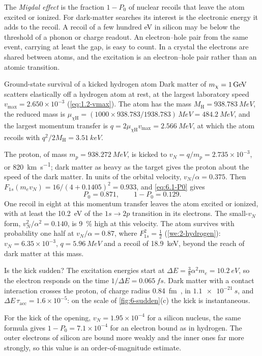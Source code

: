 The \emph{Migdal effect} is the fraction $1 - P_0$ of nuclear recoils that leave the atom excited or ionized. For dark-matter searches its interest is the electronic energy it adds to the recoil. A recoil of a few hundred eV in silicon may be below the threshold of a phonon or charge readout. An electron--hole pair from the same event, carrying at least the gap, is easy to count. In a crystal the electrons are shared between atoms, and the excitation is an electron--hole pair rather than an atomic transition.

\begin{workedexample}{Ground-state survival of a kicked hydrogen atom}\label{we:6-hydrogen}
Dark matter of $m_{\chi} = \SI{1}{GeV}$ scatters elastically off a hydrogen atom at rest, at the largest laboratory speed $v_{\mathrm{max}} = 2.650\times10^{-3}$ (\cref{eq:1.2-vmax}). The atom has the mass $M_{\mathrm{H}} = \SI{938.783}{MeV}$, the reduced mass is $\mu_{\chi\mathrm{H}} = (1000 \times 938.783/1938.783)\,\si{MeV} = \SI{484.2}{MeV}$, and the largest momentum transfer is $q = 2\mu_{\chi\mathrm{H}}v_{\mathrm{max}} = \SI{2.566}{MeV}$, at which the atom recoils with $q^2/2M_{\mathrm{H}} = \SI{3.51}{keV}$.

The proton, of mass $m_p = \SI{938.272}{MeV}$, is kicked to $v_N = q/m_p = 2.735\times10^{-3}$, or \SI{820}{km.s^{-1}}; dark matter as heavy as the target gives the proton about the speed of the dark matter. In units of the orbital velocity, $v_N/\alpha = 0.375$. Then $F_{1s}(m_ev_N) = 16/(4 + 0.1405)^2 = 0.933$, and \cref{eq:6.1-P0} gives
\begin{equation*}
  P_0 = 0.871 , \qquad 1 - P_0 = 0.129 .
\end{equation*}
One recoil in eight at this momentum transfer leaves the atom excited or ionized, with at least the \SI{10.2}{eV} of the $1s \to 2p$ transition in its electrons. The small-$v_N$ form, $v_N^2/\alpha^2 = 0.140$, is \SI{9}{\percent} high at this velocity. The atom survives with probability one half at $v_N/\alpha = 0.87$, where $F_{1s}^2 = \tfrac12$ (\cref{we:2-hydrogen}): $v_N = 6.35\times10^{-3}$, $q = \SI{5.96}{MeV}$ and a recoil of \SI{18.9}{keV}, beyond the reach of dark matter at this mass.

Is the kick sudden? The excitation energies start at $\Delta E = \tfrac38\alpha^2m_e = \SI{10.2}{eV}$, so the electron responds on the time $1/\Delta E = \SI{0.065}{fs}$. Dark matter with a contact interaction crosses the proton, of charge radius \SI{0.84}{fm}~\cite{mohr2025codata}, in $\SI{1.1e-21}{s}$, and $\Delta E\,\tau_{\mathrm{acc}} = 1.6\times10^{-5}$: on the scale of \cref{fig:6-sudden}(c) the kick is instantaneous.

For the kick of the opening, $v_N = 1.95\times10^{-4}$ for a silicon nucleus, the same formula gives $1 - P_0 = 7.1\times10^{-4}$ for an electron bound as in hydrogen. The outer electrons of silicon are bound more weakly and the inner ones far more strongly, so this value is an order-of-magnitude estimate.
\end{workedexample}
